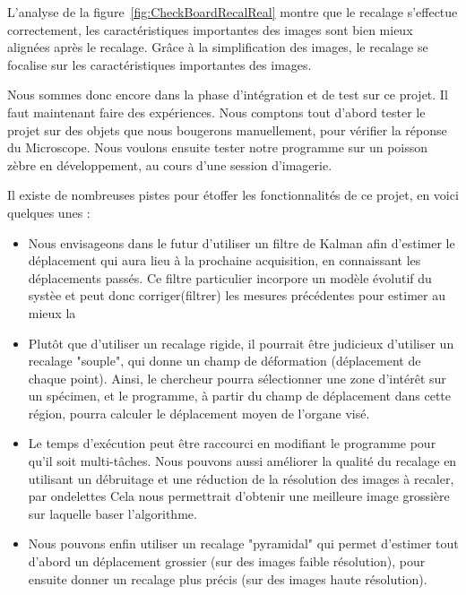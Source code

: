 L'analyse de la figure~\ref{fig:CheckBoardRecalReal} montre que le recalage s'effectue correctement,
les caractéristiques importantes des images sont bien mieux alignées après le recalage.
Grâce à la simplification des images, le recalage se focalise sur les caractéristiques importantes des images.





Nous sommes donc encore dans la phase d'intégration et de test sur ce projet.
Il faut maintenant faire des expériences. Nous comptons tout d'abord tester le projet
sur des objets que nous bougerons manuellement, pour vérifier la réponse du Microscope.
Nous voulons ensuite tester notre programme sur un poisson zèbre en développement, au cours d'une session d'imagerie.

Il existe de nombreuses pistes pour étoffer les fonctionnalités de ce projet, en voici quelques unes :\begin{itemize}
  \item Nous envisageons dans le futur d'utiliser un filtre de Kalman afin d'estimer
  le déplacement qui aura lieu à la prochaine acquisition, en connaissant les déplacements passés. Ce filtre particulier incorpore un modèle évolutif du systèe et peut donc corriger(filtrer) les mesures précédentes pour estimer au mieux la 
  \item Plutôt que d'utiliser un recalage rigide, il pourrait être judicieux d'utiliser un recalage "souple",
  qui donne un champ de déformation (déplacement de chaque point).
  Ainsi, le chercheur pourra sélectionner une zone d'intérêt sur un spécimen,
  et le programme, à partir du champ de déplacement dans cette région, pourra calculer
  le déplacement moyen de l'organe visé.
  \item Le temps d'exécution peut être raccourci en modifiant le programme pour qu'il soit multi-tâches.
  Nous pouvons aussi améliorer la qualité du recalage en utilisant un débruitage et une réduction de la résolution
  des images à recaler, par ondelettes
  Cela nous permettrait d'obtenir une meilleure image grossière sur laquelle baser l'algorithme.
  \item Nous pouvons enfin utiliser un recalage "pyramidal" qui permet d'estimer tout d'abord un déplacement
  grossier (sur des images faible résolution), pour ensuite donner un recalage plus précis (sur des images haute résolution).
\end{itemize}




\clearpage


